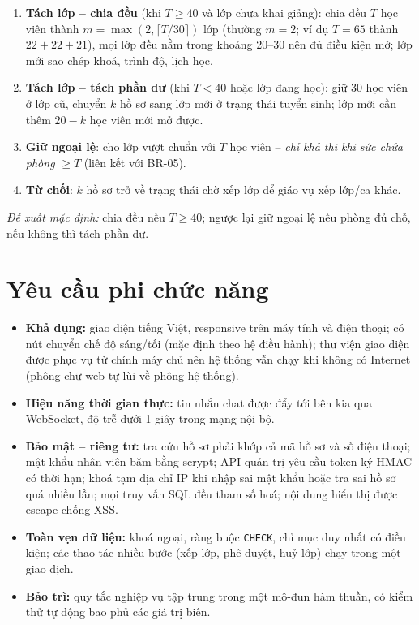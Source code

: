 \begin{rulebox}
\begin{enumerate}[leftmargin=1.6em]
  \item \textbf{Tách lớp – chia đều} (khi $T \geq 40$ và lớp chưa khai giảng): chia đều $T$ học viên thành $m = \max(2, \lceil T/30 \rceil)$ lớp (thường $m = 2$; ví dụ $T = 65$ thành $22 + 22 + 21$), mọi lớp đều nằm trong khoảng 20–30 nên đủ điều kiện mở; lớp mới sao chép khoá, trình độ, lịch học.
  \item \textbf{Tách lớp – tách phần dư} (khi $T < 40$ hoặc lớp đang học): giữ 30 học viên ở lớp cũ, chuyển $k$ hồ sơ sang lớp mới ở trạng thái tuyển sinh; lớp mới cần thêm $20 - k$ học viên mới mở được.
  \item \textbf{Giữ ngoại lệ}: cho lớp vượt chuẩn với $T$ học viên – \emph{chỉ khả thi khi sức chứa phòng} $\geq T$ (liên kết với BR-05).
  \item \textbf{Từ chối}: $k$ hồ sơ trở về trạng thái chờ xếp lớp để giáo vụ xếp lớp/ca khác.
\end{enumerate}
\textit{Đề xuất mặc định:} chia đều nếu $T \geq 40$; ngược lại giữ ngoại lệ nếu phòng đủ chỗ, nếu không thì tách phần dư.
\end{rulebox}

\section{Yêu cầu phi chức năng}
\begin{itemize}
  \item \textbf{Khả dụng:} giao diện tiếng Việt, responsive trên máy tính và điện thoại; có nút chuyển chế độ sáng/tối (mặc định theo hệ điều hành); thư viện giao diện được phục vụ từ chính máy chủ nên hệ thống vẫn chạy khi không có Internet (phông chữ web tự lùi về phông hệ thống).
  \item \textbf{Hiệu năng thời gian thực:} tin nhắn chat được đẩy tới bên kia qua WebSocket, độ trễ dưới 1 giây trong mạng nội bộ.
  \item \textbf{Bảo mật – riêng tư:} tra cứu hồ sơ phải khớp cả mã hồ sơ và số điện thoại; mật khẩu nhân viên băm bằng scrypt; API quản trị yêu cầu token ký HMAC có thời hạn; khoá tạm địa chỉ IP khi nhập sai mật khẩu hoặc tra sai hồ sơ quá nhiều lần; mọi truy vấn SQL đều tham số hoá; nội dung hiển thị được escape chống XSS.
  \item \textbf{Toàn vẹn dữ liệu:} khoá ngoại, ràng buộc \texttt{CHECK}, chỉ mục duy nhất có điều kiện; các thao tác nhiều bước (xếp lớp, phê duyệt, huỷ lớp) chạy trong một giao dịch.
  \item \textbf{Bảo trì:} quy tắc nghiệp vụ tập trung trong một mô-đun hàm thuần, có kiểm thử tự động bao phủ các giá trị biên.
\end{itemize}

